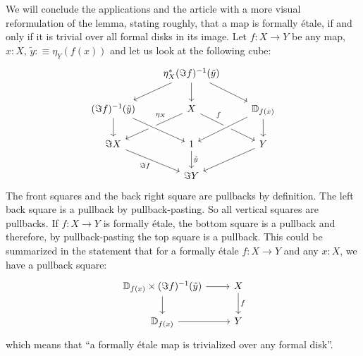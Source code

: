 \documentclass[9pt,twosided]{amsart}
\newcommand{\bD}{\mathbb D}
\begin{document}
We will conclude the applications and the article with a more visual reformulation of the lemma, stating roughly, that a map is formally étale, if and only if it is trivial over all formal disks in its image.
Let $f:X\to Y$ be any map, $x:X$, $\tilde{y}:\equiv \eta_Y(f(x))$ and let us look at the following cube:
\begin{equation*}
  \begin{tikzcd}
                        &[-1ex] \eta_X^\ast(\Im f)^{-1}(\tilde{y})\arrow[dr]\arrow[dl]\arrow[d] &                         \\
(\Im f)^{-1}(\tilde{y})\arrow[d] & X\arrow[dr, "f" near start]\arrow[dl, "\eta_X" near start, swap]     & \bD_{f(x)}\arrow[d]\arrow[dl, crossing over]   \\
 \Im X\arrow[dr, "\Im f",swap]  & 1\arrow[d ,"\tilde{y}"]\arrow[from=ul, crossing over] & Y\arrow[dl] \\
          & \Im Y &
  \end{tikzcd}
\end{equation*}
The front squares and the back right square are pullbacks by definition. The left back square is a pullback by pullback-pasting. So all vertical squares are pullbacks.
If $f:X\to Y$ is formally étale, the bottom square is a pullback and therefore, by pullback-pasting the top square is a pullback.
This could be summarized in the statement that for a formally étale $f:X\to Y$ and any $x:X$, we have a pullback square:
\begin{equation*}
  \begin{tikzcd}
    \bD_{f(x)}\times(\Im f)^{-1}(\tilde{y})\arrow[r]\arrow[d] & X\arrow[d, "f"] \\
    \bD_{f(x)} \arrow[r] & Y
  \end{tikzcd}
\end{equation*}
which means that ``a formally étale map is trivialized over any formal disk''.
\end{document}
